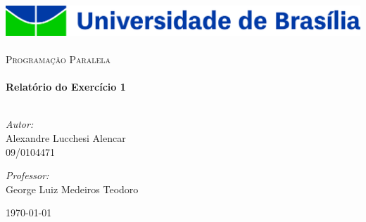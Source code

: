 \begin{titlepage}

\begin{center}

\includegraphics[width=1.0\textwidth]{img/unb_logo.jpg}~\\[1cm]

\textsc{\Large Programação Paralela}\\[0.5cm]

\HRule\\[0.4cm]
{\huge \bfseries Relatório do Exercício 1\\[0.4cm]}
\HRule\\[1.5cm]

\begin{minipage}{0.4\textwidth}
\begin{flushleft} \large
\textit{Autor:}\\
\small{Alexandre Lucchesi Alencar\\09/0104471}
\end{flushleft}
\end{minipage}
\begin{minipage}{0.4\textwidth}
\begin{flushright} \large
\textit{Professor:}\\
\small{George Luiz Medeiros Teodoro\linebreak}
\end{flushright}
\end{minipage}

\vfill

{\large \today}

\end{center}

\end{titlepage}

